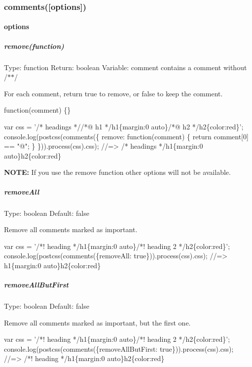 \subsubsection*{comments(\mbox{[}options\mbox{]})}

\paragraph*{options}

\subparagraph*{remove(function)}

Type\+: {\ttfamily function} Return\+: {\ttfamily boolean} Variable\+: {\ttfamily comment} contains a comment without {\ttfamily /$\ast$$\ast$/}

For each comment, return true to remove, or false to keep the comment.


\begin{DoxyCode}
function(comment) \{\}
\end{DoxyCode}



\begin{DoxyCode}
var css = '/* headings *//*@ h1 */h1\{margin:0 auto\}/*@ h2 */h2\{color:red\}';
console.log(postcss(comments(\{
    remove: function(comment) \{ return comment[0] == "@"; \}
\})).process(css).css);
//=> /* headings */h1\{margin:0 auto\}h2\{color:red\}
\end{DoxyCode}
 {\bfseries N\+O\+TE\+:} If you use the {\ttfamily remove} function other options will not be available.

\subparagraph*{remove\+All}

Type\+: {\ttfamily boolean} Default\+: {\ttfamily false}

Remove all comments marked as important.


\begin{DoxyCode}
var css = '/*! heading */h1\{margin:0 auto\}/*! heading 2 */h2\{color:red\}';
console.log(postcss(comments(\{removeAll: true\})).process(css).css);
//=> h1\{margin:0 auto\}h2\{color:red\}
\end{DoxyCode}


\subparagraph*{remove\+All\+But\+First}

Type\+: {\ttfamily boolean} Default\+: {\ttfamily false}

Remove all comments marked as important, but the first one.


\begin{DoxyCode}
var css = '/*! heading */h1\{margin:0 auto\}/*! heading 2 */h2\{color:red\}';
console.log(postcss(comments(\{removeAllButFirst: true\})).process(css).css);
//=> /*! heading */h1\{margin:0 auto\}h2\{color:red\}
\end{DoxyCode}


